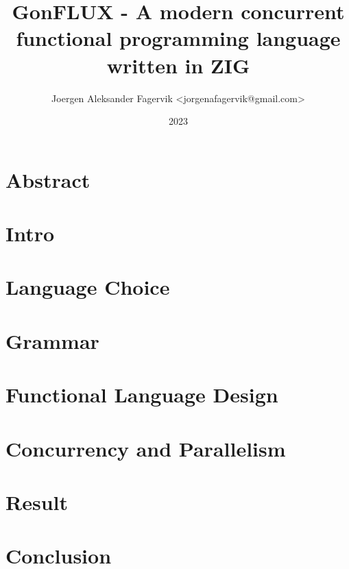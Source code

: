 \documentclass{article}
\title{GonFLUX - A modern concurrent functional programming language written in ZIG}
\date{2023}
\author{Joergen Aleksander Fagervik <jorgenafagervik@gmail.com>}
\begin{document}
  \maketitle

\section{Abstract}

\section{Intro}

\section{Language Choice}

\section{Grammar}

\section{Functional Language Design}

\section{Concurrency and Parallelism}

\section{Result}

\section{Conclusion}
\end{document}
